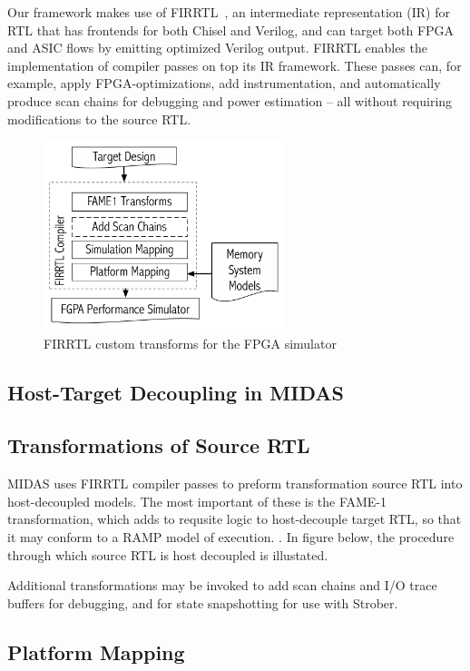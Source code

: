 Our framework makes use of FIRRTL~\cite{firrtl}, an intermediate representation
(IR) for RTL that has frontends for both Chisel and Verilog, and can target
both FPGA and ASIC flows by emitting optimized Verilog output. FIRRTL enables
the implementation of compiler passes on top its IR framework. These passes
can, for example, apply FPGA-optimizations, add instrumentation, and
automatically produce scan chains for debugging and power
estimation\cite{strober} -- all without requiring modifications to the source
RTL.

\begin{figure}
	\centering
	\includegraphics[width=7cm]{figures/firrtl.pdf}
	\caption{FIRRTL custom transforms for the FPGA simulator}
	\label{fig:firrtl}
\end{figure}


\subsection{Host-Target Decoupling in MIDAS}

\subsection{Transformations of Source RTL}

MIDAS uses FIRRTL compiler passes to preform transformation source RTL into
host-decoupled models. The most important of these is the FAME-1
transformation, which adds to requsite logic to host-decouple target RTL, so
that it may conform to a RAMP model of execution. . In figure
 below, the procedure through which source RTL is
host decoupled is illustated.




Additional transformations may be invoked to add scan
chains and I/O trace buffers for debugging, and for state snapshotting for use
with Strober\cite{strober}.

\subsection{Platform Mapping}

